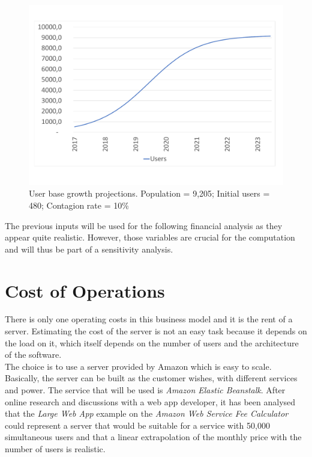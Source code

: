 \documentclass[12pt,a4paper,oneside]{book}
\begin{document}
\begin{figure}[h]
\centering
\caption{User base growth projections. Population = 9,205; Initial users = 480; Contagion rate = 10\%}
\label{ugp}
\includegraphics[keepaspectratio=true,width=\textwidth-2cm]{../graph/usergrowth.pdf}
\end{figure}

The previous inputs will be used for the following financial analysis as they appear quite realistic. However, those variables are crucial for the computation and will thus be part of a sensitivity analysis.


\section{Cost of Operations}
There is only one operating costs in this business model and it is the rent of a server. Estimating the cost of the server is not an easy task because it depends on the load on it, which itself depends on the number of users and the architecture of the software.\\

The choice is to use a server provided by Amazon which is easy to scale. Basically, the server can be built as the customer wishes, with different services and power. The service that will be used is \textit{Amazon Elastic Beanstalk}. After online research and discussions with a web app developer, it has been analysed that the \textit{Large Web App} example on the \textit{Amazon Web Service Fee Calculator} could represent a server that would be suitable for a service with 50,000 simultaneous users and that a linear extrapolation of the monthly price with the number of users is realistic.\cite{itwlois,qaws,hsaws}\\
\end{document}
